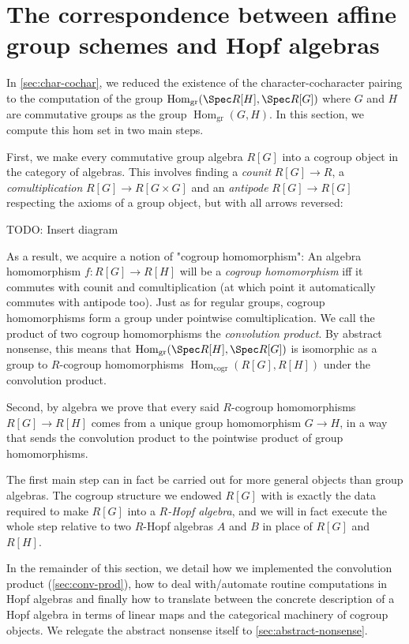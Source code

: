 \documentclass{article}
\newcommand{\Homgr}{\Hom_{\mathrm{gr}}}
\newcommand{\Homcogr}{\Hom_{\mathrm{cogr}}}
\DeclareMathOperator{\Hom}{Hom}
\begin{document}
\section{The correspondence between affine group schemes and Hopf algebras}


In \cref{sec:char-cochar}, we reduced the existence of the character-cocharacter pairing
to the computation of the group $\Homgr(\Spec R[H], \Spec R[G])$
where $G$ and $H$ are commutative groups as the group $\Homgr(G, H)$.
In this section, we compute this hom set in two main steps.

First, we make every commutative group algebra $R[G]$
into a cogroup object in the category of algebras.
This involves finding a \emph{counit} $R[G] \to R$,
a \emph{comultiplication} $R[G] \to R[G \times G]$ and an \emph{antipode} $R[G] \to R[G]$
respecting the axioms of a group object, but with all arrows reversed:

TODO: Insert diagram

As a result, we acquire a notion of "cogroup homomorphism":
An algebra homomorphism $f : R[G] \to R[H]$ will be a \emph{cogroup homomorphism} iff
it commutes with counit and comultiplication
(at which point it automatically commutes with antipode too).
Just as for regular groups, cogroup homomorphisms form a group under pointwise comultiplication.
We call the product of two cogroup homomorphisms the \emph{convolution product}.
By abstract nonsense, this means that $\Homgr(\Spec R[H], \Spec R[G])$ is isomorphic as a group to
$R$-cogroup homomorphisms $\Homcogr(R[G], R[H])$ under the convolution product.

Second, by algebra we prove that every said $R$-cogroup homomorphisms $R[G] \to R[H]$
comes from a unique group homomorphism $G \to H$,
in a way that sends the convolution product to the pointwise product of group homomorphisms.

The first main step can in fact be carried out for more general objects than group algebras.
The cogroup structure we endowed $R[G]$ with is exactly the data required
to make $R[G]$ into a \emph{$R$-Hopf algebra}, and we will in fact execute the whole step
relative to two $R$-Hopf algebras $A$ and $B$ in place of $R[G]$ and $R[H]$.

In the remainder of this section,
we detail how we implemented the convolution product (\cref{sec:conv-prod}),
how to deal with/automate routine computations in Hopf algebras
and finally how to translate between the concrete description of a Hopf algebra
in terms of linear maps and the categorical machinery of cogroup objects.
We relegate the abstract nonsense itself to \cref{sec:abstract-nonsense}.
\end{document}
